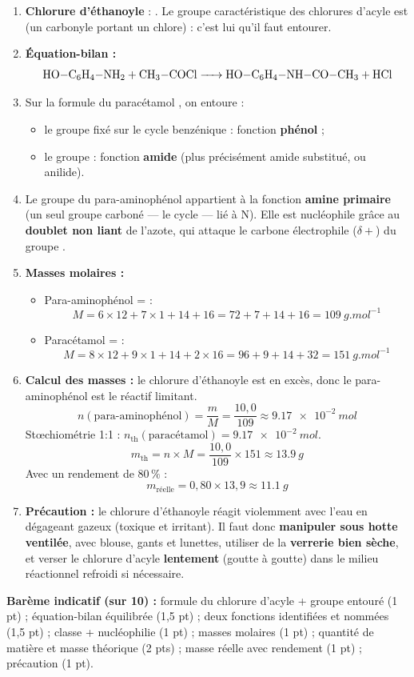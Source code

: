 \documentclass[11pt]{article}
\begin{document}
\begin{corrige}
\begin{enumerate}
\item \textbf{Chlorure d'éthanoyle} : . Le groupe caractéristique des chlorures d'acyle est  (un carbonyle portant un chlore) : c'est lui qu'il faut entourer.
\item \textbf{Équation-bilan :} \[ \ce{HO-C6H4-NH2 + CH3-COCl -> HO-C6H4-NH-CO-CH3 + HCl} \]
\item Sur la formule du paracétamol , on entoure :
\begin{itemize}
\item le groupe \textbf{} fixé sur le cycle benzénique : fonction \textbf{phénol} ;
\item le groupe \textbf{} : fonction \textbf{amide} (plus précisément amide substitué, ou anilide).
\end{itemize}
\item Le groupe  du para-aminophénol appartient à la fonction \textbf{amine primaire} (un seul groupe carboné — le cycle — lié à N). Elle est nucléophile grâce au \textbf{doublet non liant} de l'azote, qui attaque le carbone électrophile ($\delta+$) du groupe .
\item \textbf{Masses molaires :}
\begin{itemize}
\item Para-aminophénol  =  :
\[ M = 6\times 12 + 7\times 1 + 14 + 16 = 72 + 7 + 14 + 16 = \SI{109}{g.mol^{-1}} \]
\item Paracétamol  =  :
\[ M = 8\times 12 + 9\times 1 + 14 + 2\times 16 = 96 + 9 + 14 + 32 = \SI{151}{g.mol^{-1}} \]
\end{itemize}
\item \textbf{Calcul des masses :} le chlorure d'éthanoyle est en excès, donc le para-aminophénol est le réactif limitant.
\[ n(\text{para-aminophénol}) = \frac{m}{M} = \frac{10,0}{109} \approx \SI{9,17e-2}{mol} \]
Stœchiométrie 1:1 : $n_{\text{th}}(\text{paracétamol}) = \SI{9,17e-2}{mol}$.
\[ m_{\text{th}} = n \times M = \frac{10,0}{109} \times 151 \approx \SI{13,9}{g} \]
Avec un rendement de $80\,\%$ :
\[ m_{\text{réelle}} = 0,80 \times 13,9 \approx \boxed{\SI{11,1}{g}} \]
\item \textbf{Précaution :} le chlorure d'éthanoyle réagit violemment avec l'eau en dégageant  gazeux (toxique et irritant). Il faut donc \textbf{manipuler sous hotte ventilée}, avec blouse, gants et lunettes, utiliser de la \textbf{verrerie bien sèche}, et verser le chlorure d'acyle \textbf{lentement} (goutte à goutte) dans le milieu réactionnel refroidi si nécessaire.
\end{enumerate}
\medskip
\textbf{Barème indicatif (sur 10) :} formule du chlorure d'acyle + groupe entouré (1 pt) ; équation-bilan équilibrée (1,5 pt) ; deux fonctions identifiées et nommées (1,5 pt) ; classe + nucléophilie (1 pt) ; masses molaires (1 pt) ; quantité de matière et masse théorique (2 pts) ; masse réelle avec rendement (1 pt) ; précaution (1 pt).
\medskip


\end{corrige}
\end{document}
